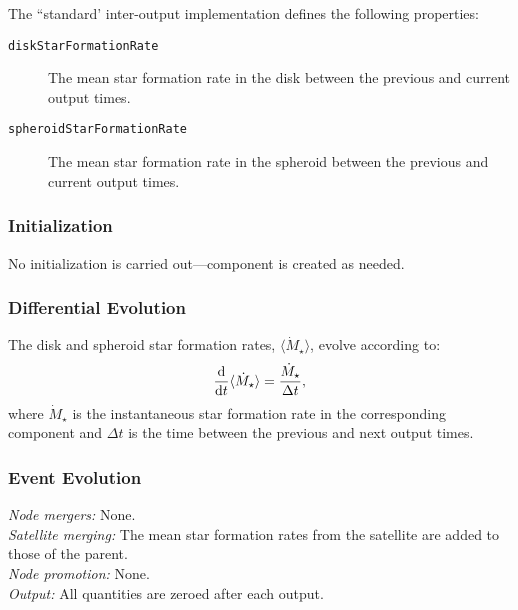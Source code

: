 The ``standard' inter-output implementation defines the following properties:
\begin{description}
 \item [{\tt diskStarFormationRate}] The mean star formation rate in the disk between the previous and current output times.
 \item [{\tt spheroidStarFormationRate}] The mean star formation rate in the spheroid between the previous and current output times.
\end{description}

\subsubsection{Initialization}

No initialization is carried out---component is created as needed.

\subsubsection{Differential Evolution}

The disk and spheroid star formation rates, $\langle \dot{M}_\star \rangle$, evolve according to:
\begin{equation}
{{\rm d} \over {\rm d} t} \langle \dot{M}_\star \rangle = {\dot{M}_\star \over \Delta t},
\end{equation}
where $\dot{M}_\star$ is the instantaneous star formation rate in the corresponding component and $\Delta t$ is the time between the previous and next output times.

\subsubsection{Event Evolution}

\noindent\emph{Node mergers:} None.\\

\noindent\emph{Satellite merging:} The mean star formation rates from the satellite are added to those of the parent.\\

\noindent\emph{Node promotion:} None.\\

\noindent\emph{Output:} All quantities are zeroed after each output.\\

